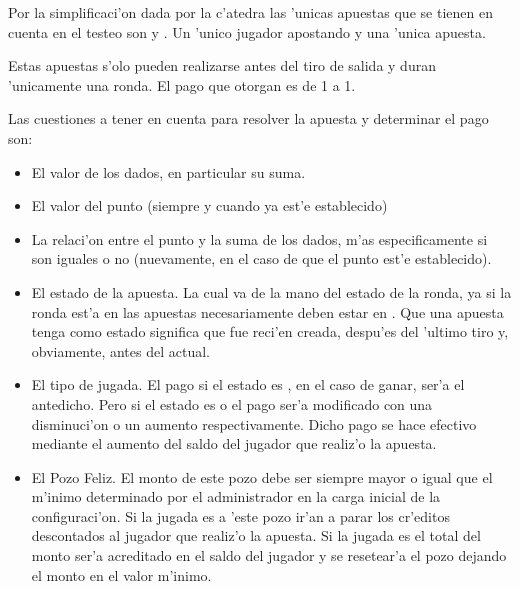 Por la simplificaci'on dada por la c'atedra las 'unicas apuestas que se tienen en cuenta en el testeo son  y . Un 'unico jugador apostando y una 'unica apuesta.

Estas apuestas s'olo pueden realizarse antes del tiro de salida y duran 'unicamente una ronda. El pago que otorgan es de 1 a 1.

Las cuestiones a tener en cuenta para resolver la apuesta y determinar el pago son:
\begin{itemize}
\item El valor de los dados, en particular su suma.
\item El valor del punto (siempre y cuando ya est'e establecido)
\item La relaci'on entre el punto y la suma de los dados, m'as especificamente si son iguales o no (nuevamente, en el caso de que el punto est'e establecido).
\item El estado de la apuesta. La cual va de la mano del estado de la ronda, ya si la ronda est'a en  las apuestas necesariamente deben estar en . Que una apuesta tenga como estado  significa que fue reci'en creada, despu'es del 'ultimo tiro y, obviamente, antes del actual.
\item El tipo de jugada. El pago si el estado es , en el caso de ganar, ser'a el antedicho. Pero si el estado es  o  el pago ser'a modificado con una disminuci'on o un aumento respectivamente. Dicho pago se hace efectivo mediante el aumento del saldo del jugador que realiz'o la apuesta.
\item El Pozo Feliz. El monto de este pozo debe ser siempre mayor o igual que el m'inimo determinado por el administrador en la carga inicial de la configuraci'on. Si la jugada es  a 'este pozo ir'an a parar los cr'editos descontados al jugador que realiz'o la apuesta. Si la jugada es  el total del monto ser'a acreditado en el saldo del jugador y se resetear'a el pozo dejando el monto en el valor m'inimo.
\end{itemize}



 


